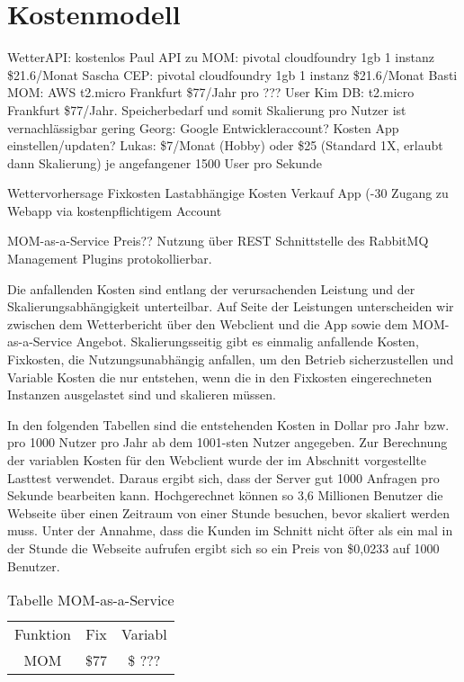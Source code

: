 \section{Kostenmodell}
WetterAPI: kostenlos
Paul API zu MOM: pivotal cloudfoundry 1gb 1 instanz \$21.6/Monat
Sascha CEP: pivotal cloudfoundry 1gb 1 instanz \$21.6/Monat
Basti MOM: AWS t2.micro Frankfurt \$77/Jahr pro ??? User
Kim DB: t2.micro Frankfurt \$77/Jahr. Speicherbedarf und somit Skalierung pro Nutzer ist vernachlässigbar gering 
Georg:  Google Entwickleraccount? Kosten App einstellen/updaten?
Lukas: \$7/Monat (Hobby) oder \$25 (Standard 1X, erlaubt dann Skalierung) je angefangener 1500 User pro Sekunde


Wettervorhersage
Fixkosten
Lastabhängige Kosten
Verkauf App (-30%
Zugang zu Webapp via kostenpflichtigem Account

MOM-as-a-Service
Preis?? Nutzung über REST Schnittstelle des RabbitMQ Management Plugins protokollierbar. 


Die anfallenden Kosten sind entlang der verursachenden Leistung und der Skalierungsabhängigkeit unterteilbar. Auf Seite der Leistungen unterscheiden wir zwischen dem Wetterbericht über den Webclient und die App sowie dem MOM-as-a-Service Angebot. Skalierungsseitig gibt es einmalig anfallende Kosten, Fixkosten, die Nutzungsunabhängig anfallen, um den Betrieb sicherzustellen und Variable Kosten die nur entstehen, wenn die in den Fixkosten eingerechneten Instanzen ausgelastet sind und skalieren müssen.

In den folgenden Tabellen sind die entstehenden Kosten in Dollar pro Jahr bzw. pro 1000 Nutzer pro Jahr ab dem 1001-sten Nutzer angegeben. Zur Berechnung der variablen Kosten für den Webclient wurde der im Abschnitt  vorgestellte Lasttest verwendet. Daraus ergibt sich, dass der Server gut 1000 Anfragen pro Sekunde bearbeiten kann. Hochgerechnet können so 3,6 Millionen Benutzer die Webseite über einen Zeitraum von einer Stunde besuchen, bevor skaliert werden muss. Unter der Annahme, dass die Kunden im Schnitt nicht öfter als ein mal in der Stunde die Webseite aufrufen ergibt sich so ein Preis von \$0,0233 auf 1000 Benutzer.

\begin{table}
\caption{Tabelle MOM-as-a-Service}
\centering
\begin{tabular}{ccc}
	Funktion & Fix & Variabl \\
	MOM & \$77 & \$ ??? \\
\end{tabular}
\end{table}

